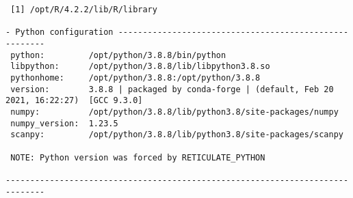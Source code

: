 \documentclass[
  letterpaper,
  DIV=11,
  numbers=noendperiod]{scrartcl}
\begin{document}
\begin{verbatim}
 [1] /opt/R/4.2.2/lib/R/library

- Python configuration -------------------------------------------------------
 python:         /opt/python/3.8.8/bin/python
 libpython:      /opt/python/3.8.8/lib/libpython3.8.so
 pythonhome:     /opt/python/3.8.8:/opt/python/3.8.8
 version:        3.8.8 | packaged by conda-forge | (default, Feb 20 2021, 16:22:27)  [GCC 9.3.0]
 numpy:          /opt/python/3.8.8/lib/python3.8/site-packages/numpy
 numpy_version:  1.23.5
 scanpy:         /opt/python/3.8.8/lib/python3.8/site-packages/scanpy
 
 NOTE: Python version was forced by RETICULATE_PYTHON

------------------------------------------------------------------------------
\end{verbatim}
\end{document}
